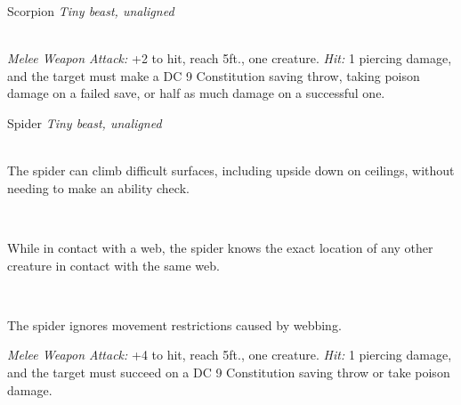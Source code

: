 \documentclass[10pt,twoside,twocolumn,openany]{book}
\begin{document}
\begin{monsterboxnobg}{Scorpion}
	\textit{Tiny beast, unaligned}\\
	\hline
	\basics[
		armorclass	= 11 (natural armor),
		hitpoints 		= \dice{1d4 - 1},
		speed		= {10 ft.}
	]
	\hline
	\stats[
		STR	= \stat{2},
		DEX	= \stat{11},
		CON	= \stat{8},
		INT	= \stat{1},
		WIS	= \stat{8},
		CHA	= \stat{2}
	]
	\hline
	\details[
		skills			= {},
		senses 		= {blindsight 10 ft., passive Perception 9},
		languages		= {-},
		challenge		= 0
	]
	\hline \\[1mm]
	\begin{monsteraction}[Sting]
		\textit{Melee Weapon Attack:} +2 to hit, reach 5ft., one creature. \textit{Hit:} 1 piercing damage, and the target must make a DC 9 Constitution saving throw, taking  poison damage on a failed save, or half as much damage on a successful one.
	\end{monsteraction}
\end{monsterboxnobg}
\newpage
\begin{monsterboxnobg}{Spider}
	\textit{Tiny beast, unaligned}\\
	\hline
	\basics[
		armorclass	= 12,
		hitpoints 		= \dice{1d4 - 1},
		speed		= {20 ft.}
	]
	\hline
	\stats[
		STR	= \stat{2},
		DEX	= \stat{14},
		CON	= \stat{8},
		INT	= \stat{1},
		WIS	= \stat{10},
		CHA	= \stat{2}
	]
	\hline
	\details[
		skills			= {Stealth +4},
		senses 		= {darkvision 30 ft., passive Perception 10},
		languages		= {-},
		challenge		= 0
	]
	\hline \\[1mm]
	\begin{monsteraction}
		The spider can climb difficult surfaces, including upside down on ceilings, without needing to make an ability check.
	\end{monsteraction}\\
	\begin{monsteraction}
		While in contact with a web, the spider knows the exact location of any other creature in contact with the same web.
	\end{monsteraction}\\
	\begin{monsteraction}
		The spider ignores movement restrictions caused by webbing.
	\end{monsteraction}
	\begin{monsteraction}[Bite]
		\textit{Melee Weapon Attack:} +4 to hit, reach 5ft., one creature. \textit{Hit:} 1 piercing damage, and the target must succeed on a DC 9 Constitution saving throw or take  poison damage.
	\end{monsteraction}
\end{monsterboxnobg}
\end{document}
